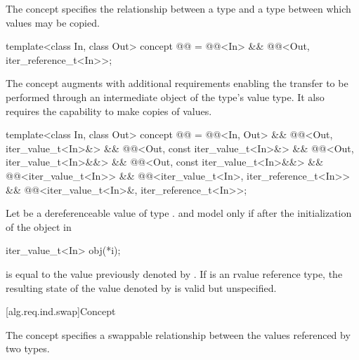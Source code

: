 \pnum
The  concept specifies the relationship between
a  type and a  type
between which values may be copied.

\begin{codeblock}
template<class In, class Out>
  concept @@ =
    @@<In> &&
    @@<Out, iter_reference_t<In>>;
\end{codeblock}

\pnum
The  concept augments
 with additional requirements enabling
the transfer to be performed through an intermediate object of the
 type's value type. It also requires the capability
to make copies of values.

\begin{codeblock}
template<class In, class Out>
  concept @@ =
    @@<In, Out> &&
    @@<Out, iter_value_t<In>&> &&
    @@<Out, const iter_value_t<In>&> &&
    @@<Out, iter_value_t<In>&&> &&
    @@<Out, const iter_value_t<In>&&> &&
    @@<iter_value_t<In>> &&
    @@<iter_value_t<In>, iter_reference_t<In>> &&
    @@<iter_value_t<In>&, iter_reference_t<In>>;
\end{codeblock}

\pnum
Let  be a dereferenceable value of type .
 and  model 
only if after the initialization of the object  in
\begin{codeblock}
iter_value_t<In> obj(*i);
\end{codeblock}
 is equal to the value previously denoted by . If
 is an rvalue reference type, the resulting state
of the value denoted by  is
valid but unspecified.

[alg.req.ind.swap]{Concept }

\pnum
The  concept specifies a swappable relationship
between the values referenced by two  types.

